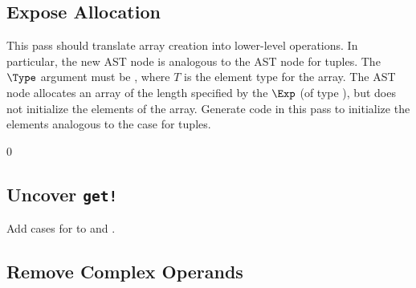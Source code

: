 \documentclass[7x10]{TimesAPriori_MIT}%
\def\racketEd{0}
\def\edition{1}
\numberwithin{theorem}{chapter}
\numberwithin{definition}{chapter}
\numberwithin{equation}{chapter}
\begin{document}


\subsection{Expose Allocation}

This pass should translate array creation into lower-level
operations. In particular, the new AST node \ALLOCARRAY{\Exp}{\Type}
is analogous to the  AST node for tuples.  The $\Type$
argument must be , where $T$ is the element type for the
array. The  AST node allocates an array of the
length specified by the $\Exp$ (of type \INTTY), but does not
initialize the elements of the array. Generate code in this pass to
initialize the elements analogous to the case for tuples.


{\if\edition\racketEd
\subsection{Uncover \texttt{get!}}
\label{sec:uncover-get-bang-vecof}

Add cases for  to  and
.

\fi}

\subsection{Remove Complex Operands}
\end{document}

